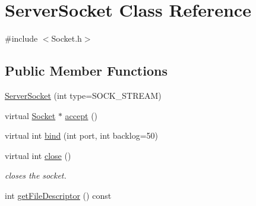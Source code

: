 \hypertarget{classServerSocket}{\section{Server\-Socket Class Reference}
\label{classServerSocket}
}


{\ttfamily \#include $<$Socket.\-h$>$}

\subsection*{Public Member Functions}
\begin{DoxyCompactItemize}
\item 
\hyperlink{classServerSocket_a668d35aeea12aafa0025ecbc6313113f}{Server\-Socket} (int type=S\-O\-C\-K\-\_\-\-S\-T\-R\-E\-A\-M)
\item 
virtual \hyperlink{classSocket}{Socket} $\ast$ \hyperlink{classServerSocket_accc3d56d42aa50a5f3c920cf0b26959b}{accept} ()
\item 
virtual int \hyperlink{classServerSocket_ad5281fe6c005bca007a9a758bd612481}{bind} (int port, int backlog=50)
\item 
\hypertarget{classServerSocket_a3eac6d5571bb092622d328dbda2de2cf}{virtual int \hyperlink{classServerSocket_a3eac6d5571bb092622d328dbda2de2cf}{close} ()}\label{classServerSocket_a3eac6d5571bb092622d328dbda2de2cf}

\begin{DoxyCompactList}\small\item\em closes the socket. \end{DoxyCompactList}\item 
\hypertarget{classServerSocket_a73a32b4697d3ff2bc9a68700f06e4dfb}{int \hyperlink{classServerSocket_a73a32b4697d3ff2bc9a68700f06e4dfb}{get\-File\-Descriptor} () const }\label{classServerSocket_a73a32b4697d3ff2bc9a68700f06e4dfb}


\end{DoxyCompactItemize}
